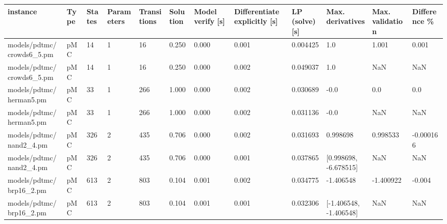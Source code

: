 \begin{tabular}{llllllllllll}
\toprule
                                          instance & Type & States & Parameters & Transitions &       Solution & Model verify [s] & Differentiate explicitly [s] & LP (solve) [s] &                                   Max. derivatives &    Max. validation & Difference \% \\
\midrule
                         models/pdtmc/crowds6\_5.pm &  pMC &     14 &          1 &          16 &          0.250 &            0.000 &                        0.001 &       0.004425 &                                                1.0 &              1.001 &        0.001 \\
                         models/pdtmc/crowds6\_5.pm &  pMC &     14 &          1 &          16 &          0.250 &            0.000 &                        0.002 &       0.049037 &                                                1.0 &                NaN &          NaN \\
                           models/pdtmc/herman5.pm &  pMC &     33 &          1 &         266 &          1.000 &            0.000 &                        0.002 &       0.030689 &                                               -0.0 &                0.0 &          0.0 \\
                           models/pdtmc/herman5.pm &  pMC &     33 &          1 &         266 &          1.000 &            0.000 &                        0.002 &       0.031136 &                                               -0.0 &                NaN &          NaN \\
                           models/pdtmc/nand2\_4.pm &  pMC &    326 &          2 &         435 &          0.706 &            0.000 &                        0.002 &       0.031693 &                                           0.998698 &           0.998533 &    -0.000166 \\
                           models/pdtmc/nand2\_4.pm &  pMC &    326 &          2 &         435 &          0.706 &            0.000 &                        0.001 &       0.037865 &                              [0.998698, -6.678515] &                NaN &          NaN \\
                           models/pdtmc/brp16\_2.pm &  pMC &    613 &          2 &         803 &          0.104 &            0.001 &                        0.002 &       0.034775 &                                          -1.406548 &          -1.400922 &       -0.004 \\
                           models/pdtmc/brp16\_2.pm &  pMC &    613 &          2 &         803 &          0.104 &            0.001 &                        0.001 &       0.032306 &                             [-1.406548, -1.406548] &                NaN &          NaN \\

\end{tabular}
